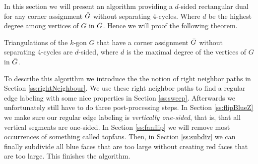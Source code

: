   In this section we will present an algorithm providing a $d$-sided rectangular dual for any corner assignment $\bar{G}$ without separating $4$-cycles. Where $d$ be the highest degree among vertices of $G$ in $\bar{G}$.  Hence we will proof the following theorem.

  \begin{thrm}
  \label{th:dsided}
  Triangulations of the $k$-gon $G$ that have a corner assignment $\bar{G}$ without separating 4-cycles are $d$-sided, where $d$ is the maximal degree of the vertices of $G$ in $\bar{G}$.
  \end{thrm}

  To describe this algorithm we introduce the the notion of right neighbor paths in Section \ref{ss:rightNeighbour}.  We use these right neighbor paths to find a regular edge labeling with some nice properties in Section \ref{ss:sweep}. Afterwards we unfortunately still have to do three post-processing steps. In Section \ref{ss:flipBlueZ} we make sure our regular edge labeling is \emph{vertically one-sided}, that is, that all vertical segments are one-sided. In Section \ref{ss:fanflip} we will remove most occurrences of something called topfans. Then, in Section \ref{ss:subdiv} we can finally subdivide all blue faces that are too large without creating red faces that are too large. This finishes the algorithm.
